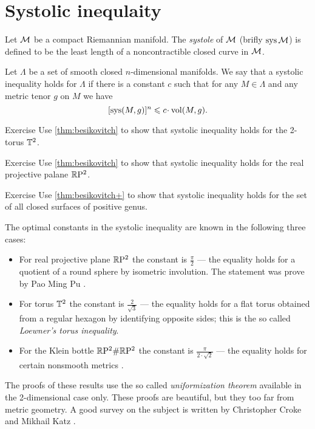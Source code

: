 \section{Systolic inequlaity}

Let $\mathcal{M}$ be a compact Riemannian manifold.
The \emph{systole} of $\mathcal{M}$ (brifly $\mathop{\rm sys}\nolimits\mathcal{M}$) is defined to be the least length of a noncontractible closed curve in $\mathcal{M}$.

Let $\Lambda$ be a set of smooth closed $n$-dimensional manifolds.
We say that a systolic inequality holds for $\Lambda$ if there is a constant $c$ such that for any $M\in \Lambda$ and any metric tenor $g$ on $M$ we have
\[[\sys(M,g)]^n\le c\cdot \vol(M,g).\]

\begin{thm}{Exercise}\label{ex:sysT2}
Use \ref{thm:besikovitch} to show that systolic inequality holds for the 2-torus $\mathbb{T}^2$.
\end{thm}

\begin{thm}{Exercise}\label{ex:sysRP2}
Use \ref{thm:besikovitch} to show that systolic inequality holds for the real projective palane $\mathbb{R}\mathrm{P}^2$.
\end{thm}

\begin{thm}{Exercise}\label{ex:sysSg}
Use \ref{thm:besikovitch+} to show that systolic inequality holds for the set of all closed surfaces of positive genus.
\end{thm}

The optimal constants in the systolic inequality are known in the following three cases:
\begin{itemize}
\item For real projective plane $\mathbb{R}\mathrm{P}^2$ the constant is $\tfrac\pi2$ --- the equality holds for a quotient of a round sphere by isometric involution. The statement was prove by Pao Ming Pu \cite{pu}.\label{page:pu}
\item For torus $\mathbb{T}^2$ the constant is $\tfrac2{\sqrt{3}}$ --- the equality holds for a flat torus obtained from a regular hexagon by identifying opposite sides; this is the so called \emph{Loewner's torus inequality}.
\item For the Klein bottle $\mathbb{R}\mathrm{P}^2\#\mathbb{R}\mathrm{P}^2$  the constant is $\tfrac\pi{2\cdot\sqrt2}$ --- the equality holds for certain nonsmooth metrics \cite{bavard}.
\end{itemize}
The proofs of these results use the so called \emph{uniformization theorem}   available in the 2-dimensional case only.
These proofs are beautiful, but they too far from metric geometry.
A good survey on the subject is written by Christopher Croke and Mikhail Katz \cite{croke-katz}.

